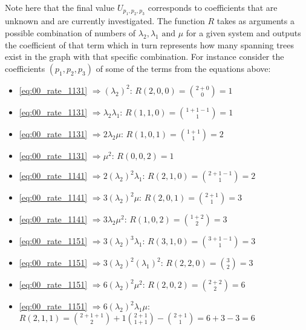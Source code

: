 Note here that the final value \(U_{p_1,p_2,p_3}\) corresponds to coefficients
that are unknown and are currently investigated.
The function \(R\) takes as arguments a possible combination of numbers of
\(\lambda_2, \lambda_1 \text{ and } \mu \) for a given system and outputs the
coefficient of that term which in turn represents how many spanning trees exist
in the graph with that specific combination.
For instance consider the coefficients \((p_1,p_2,p_3)\) of some of the terms
from the equations above:

\tiny
\begin{multicols}{2}
    \begin{itemize}
        \item \eqref{eq:00_rate_1131} \( \Rightarrow (\lambda_2)^2\):
        \(R(2,0,0) = \binom{2+0}{0} = 1\)
        \item \eqref{eq:00_rate_1131} \( \Rightarrow \lambda_2 \lambda_1\):
        \(R(1,1,0) = \binom{1+1-1}{1} = 1\)
        \item \eqref{eq:00_rate_1131} \( \Rightarrow 2 \lambda_2 \mu\):
        \(R(1,0,1) = \binom{1+1}{1} = 2\)
        \item \eqref{eq:00_rate_1131} \( \Rightarrow \mu^2\): \(R(0,0,2) = 1\)
        \item \eqref{eq:00_rate_1141} \( \Rightarrow 2(\lambda_2)^2 \lambda_1\):
        \(R(2,1,0) = \binom{2+1-1}{1} = 2\)
        \item \eqref{eq:00_rate_1141} \( \Rightarrow 3(\lambda_2)^2 \mu\):
        \(R(2,0,1) = \binom{2+1}{1} = 3\)
        \item \eqref{eq:00_rate_1141} \( \Rightarrow 3 \lambda_2 \mu^2\):
        \(R(1,0,2) = \binom{1+2}{2} = 3\)
        \item \eqref{eq:00_rate_1151} \( \Rightarrow 3 (\lambda_2)^3
        \lambda_1\): \(R(3,1,0) = \binom{3+1-1}{1} = 3\)
        \item \eqref{eq:00_rate_1151} \( \Rightarrow 3 (\lambda_2)^2
        (\lambda_1)^2 \): \(R(2,2,0) = \binom{3}{2} = 3\)
        \item \eqref{eq:00_rate_1151} \( \Rightarrow 6 (\lambda_2)^2 \mu ^ 2\):
        \(R(2,0,2) = \binom{2+2}{2} = 6\)
    \end{itemize}
\end{multicols}

\begin{itemize}
    \item \eqref{eq:00_rate_1151} \( \Rightarrow 6 (\lambda_2)^2 \lambda_1 \mu\):
    \(R(2,1,1) = \binom{2+1+1}{2} + 1\binom{2+1}{1+1} - \binom{2+1}{1} =
    6 + 3 - 3 = 6\)
\end{itemize}
\small

